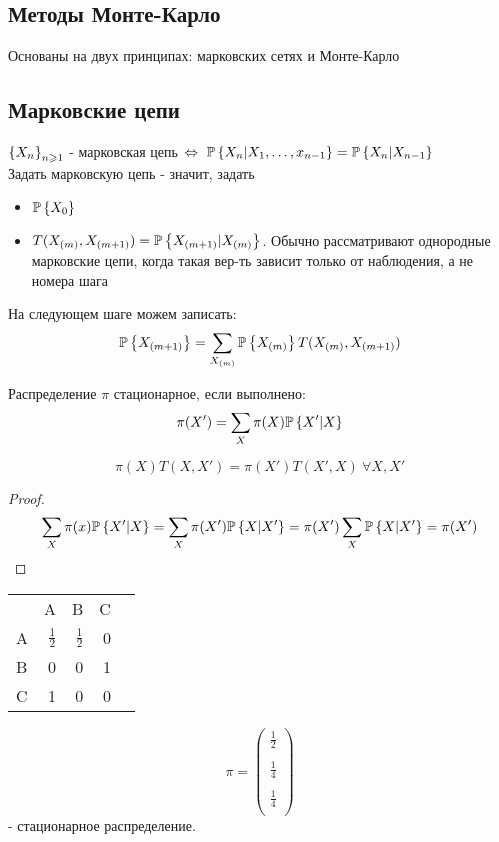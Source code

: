 \subsection*{Методы Монте-Карло}
Основаны на двух принципах: марковских сетях и Монте-Карло

\subsection*{Марковские цепи}
\begin{definition}
$ \left\{ X_n \right\}_{n \geqslant 1} $ - марковская цепь $\Leftrightarrow \ \prob{X_n|X_1, \ldots, x_{n-1}} = \prob{X_n|X_{n-1}}$ \\
Задать марковскую цепь - значит, задать \begin{itemize}
	\item $\mathbb{P}\left\{ X_0 \right\}$
	\item $T(X_{(m)}, X_{(m+1)}) = \mathbb{P}\left\{ X_{(m+1)}|X_{(m)} \right\}$. Обычно рассматривают однородные марковские цепи, когда такая вер-ть зависит только от наблюдения, а не номера шага
\end{itemize}
На следующем шаге можем записать: $$ \mathbb{P}\left\{ X_{(m+1)} \right\} = \sum_{X_{(m)}} \mathbb{P}\left\{ X_{(m)} \right\} T(X_{(m)}, X_{(m+1)})$$
\end{definition}
\begin{definition}
	Распределение $\pi$ стационарное, если выполнено: $$ \pi(X') = \sum_X \pi(X) \mathbb{P}\left\{ X'|X \right\} $$
\end{definition}
\begin{theorem}
	$$ \pi(X)T(X, X') = \pi(X')T(X',X)  \ \forall X, X'$$
	\begin{proof}
		$$ \sum_X \pi(x) \mathbb{P}\left\{ X'|X \right\} = \sum_X \pi(X')\mathbb{P}\left\{ X|X' \right\} = \pi(X') \sum_X \mathbb{P}\left\{ X|X' \right\} = \pi(X') $$
	\end{proof}
\end{theorem}

\begin{example}

	\begin{tabular}{lrrrr}
		{} & A & B & C \\
		A & $\frac{1}{2}$ & $\frac{1}{2}$ & 0 \\
		B & 0 & 0 & 1 \\
		C & 1 & 0 & 0
	\end{tabular}
	$$ \pi = \begin{pmatrix}
		\frac{1}{2} \\ \\
		\frac{1}{4} \\ \\
		\frac{1}{4} \\
	\end{pmatrix}$$ - стационарное распределение.
\end{example}

